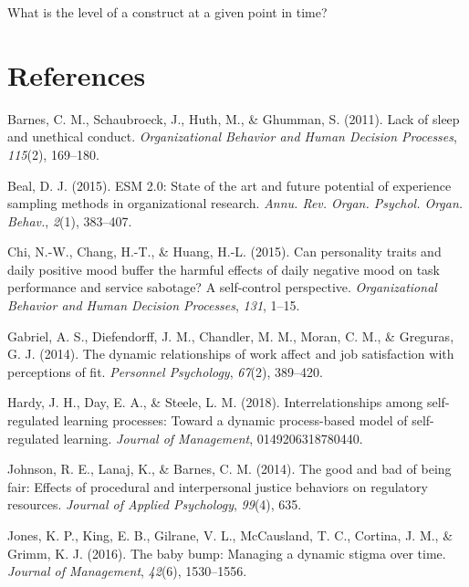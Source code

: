 \documentclass[english,,man]{apa6}
\theoremstyle{definition}
\theoremstyle{definition}
\theoremstyle{definition}
\theoremstyle{remark}
\begin{document}
What is the level of a construct at a given point in time?

\newpage

\hypertarget{references}{%
\section{References}\label{references}}

\setlength{\parindent}{-0.5in}
\setlength{\leftskip}{0.5in}

\hypertarget{refs}{}
\leavevmode\hypertarget{ref-barnes2011}{}%
Barnes, C. M., Schaubroeck, J., Huth, M., \& Ghumman, S. (2011). Lack of
sleep and unethical conduct. \emph{Organizational Behavior and Human
Decision Processes}, \emph{115}(2), 169--180.

\leavevmode\hypertarget{ref-beal2015}{}%
Beal, D. J. (2015). ESM 2.0: State of the art and future potential of
experience sampling methods in organizational research. \emph{Annu. Rev.
Organ. Psychol. Organ. Behav.}, \emph{2}(1), 383--407.

\leavevmode\hypertarget{ref-chi2015}{}%
Chi, N.-W., Chang, H.-T., \& Huang, H.-L. (2015). Can personality traits
and daily positive mood buffer the harmful effects of daily negative
mood on task performance and service sabotage? A self-control
perspective. \emph{Organizational Behavior and Human Decision
Processes}, \emph{131}, 1--15.

\leavevmode\hypertarget{ref-gabriel2014}{}%
Gabriel, A. S., Diefendorff, J. M., Chandler, M. M., Moran, C. M., \&
Greguras, G. J. (2014). The dynamic relationships of work affect and job
satisfaction with perceptions of fit. \emph{Personnel Psychology},
\emph{67}(2), 389--420.

\leavevmode\hypertarget{ref-hardy2018}{}%
Hardy, J. H., Day, E. A., \& Steele, L. M. (2018). Interrelationships
among self-regulated learning processes: Toward a dynamic process-based
model of self-regulated learning. \emph{Journal of Management},
0149206318780440.

\leavevmode\hypertarget{ref-johnson2014}{}%
Johnson, R. E., Lanaj, K., \& Barnes, C. M. (2014). The good and bad of
being fair: Effects of procedural and interpersonal justice behaviors on
regulatory resources. \emph{Journal of Applied Psychology},
\emph{99}(4), 635.

\leavevmode\hypertarget{ref-jones2016}{}%
Jones, K. P., King, E. B., Gilrane, V. L., McCausland, T. C., Cortina,
J. M., \& Grimm, K. J. (2016). The baby bump: Managing a dynamic stigma
over time. \emph{Journal of Management}, \emph{42}(6), 1530--1556.
\end{document}
